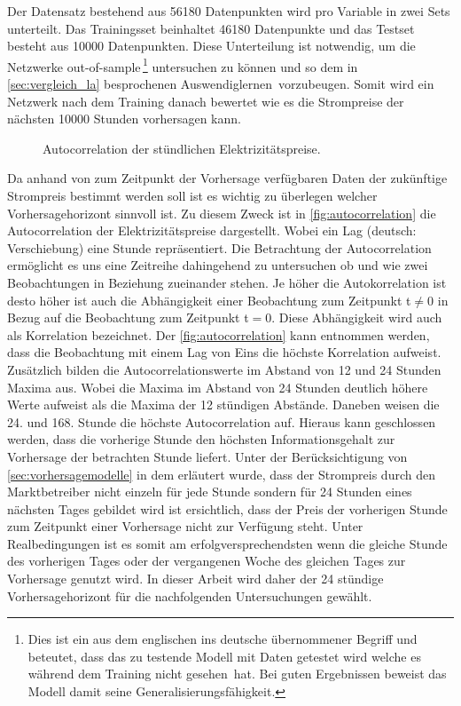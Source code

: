 Der Datensatz bestehend aus 56180 Datenpunkten wird pro Variable in zwei Sets unterteilt. Das Trainingsset beinhaltet 46180 Datenpunkte und das Testset besteht aus 10000 Datenpunkten. Diese Unterteilung ist notwendig, um die Netzwerke out-of-sample\,\footnote{Dies ist ein aus dem englischen ins deutsche übernommener Begriff und beteutet, dass das zu testende Modell mit Daten getestet wird welche es während dem Training nicht \glqq gesehen\grqq~hat. Bei guten Ergebnissen beweist das Modell damit seine Generalisierungsfähigkeit.} untersuchen zu können und so dem in \autoref{sec:vergleich_la} besprochenen \glqq Auswendiglernen\grqq~vorzubeugen. Somit wird ein Netzwerk nach dem Training danach bewertet wie es die Strompreise der nächsten 10000 Stunden vorhersagen kann.

\begin{figure}[!htb]
    \centering
        
    \caption{Autocorrelation der stündlichen Elektrizitätspreise.}
    \label{fig:autocorrelation}
\end{figure}

Da anhand von zum Zeitpunkt der Vorhersage verfügbaren Daten der zukünftige Strompreis bestimmt werden soll ist es wichtig zu überlegen welcher Vorhersagehorizont sinnvoll ist. 
Zu diesem Zweck ist in \autoref{fig:autocorrelation} die Autocorrelation der Elektrizitätspreise dargestellt. Wobei ein Lag (deutsch: Verschiebung) eine Stunde repräsentiert. Die Betrachtung der Autocorrelation ermöglicht es uns eine Zeitreihe dahingehend zu untersuchen ob und wie zwei Beobachtungen in Beziehung zueinander stehen. Je höher die Autokorrelation ist desto höher ist auch die Abhängigkeit einer Beobachtung zum Zeitpunkt t$\neq$0 in Bezug auf die Beobachtung zum Zeitpunkt t$=$0. Diese Abhängigkeit wird auch als Korrelation bezeichnet. Der \autoref{fig:autocorrelation} kann entnommen werden, dass die Beobachtung mit einem Lag von Eins die höchste Korrelation aufweist. Zusätzlich bilden die Autocorrelationswerte im Abstand von 12 und 24 Stunden Maxima aus. Wobei die Maxima im Abstand von 24 Stunden deutlich höhere Werte aufweist als die Maxima der 12 stündigen Abstände. Daneben weisen die 24. und 168. Stunde die höchste Autocorrelation auf. 
Hieraus kann geschlossen werden, dass die vorherige Stunde den höchsten Informationsgehalt zur Vorhersage der betrachten Stunde liefert. Unter der Berücksichtigung von \autoref{sec:vorhersagemodelle} in dem erläutert wurde, dass der Strompreis durch den Marktbetreiber nicht einzeln für jede Stunde sondern für 24 Stunden eines nächsten Tages gebildet wird ist ersichtlich, dass der Preis der vorherigen Stunde zum Zeitpunkt einer Vorhersage nicht zur Verfügung steht. Unter Realbedingungen ist es somit am erfolgversprechendsten wenn die gleiche Stunde des vorherigen Tages oder der vergangenen Woche des gleichen Tages zur Vorhersage genutzt wird. In dieser Arbeit wird daher der 24 stündige Vorhersagehorizont für die nachfolgenden Untersuchungen gewählt. 

